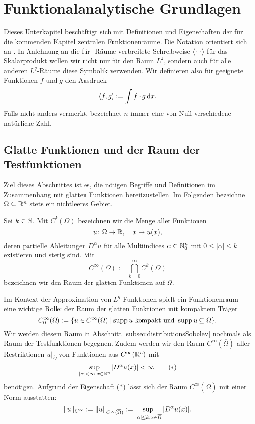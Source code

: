 \chapter{Funktionalanalytische Grundlagen}
\label{cp:grundlagen}

Dieses Unterkapitel beschäftigt sich mit Definitionen und Eigenschaften der für die kommenden Kapitel zentralen Funktionenräume.
Die Notation orientiert sich an \cite{sohr2001navier}.
In Anlehnung an die für \hilbert\hyp{}Räume verbreitete Schreibweise $\langle \cdot, \cdot \rangle$ für das Skalarprodukt wollen wir nicht nur für den Raum $L^2$, sondern auch für alle anderen $L^q$\hyp{}Räume diese Symbolik verwenden.
Wir definieren also für geeignete Funktionen $f$ und $g$ den Ausdruck
$$
\langle f, g \rangle := \int f \cdot g \, {\operatorname{d}\!{x}}.
$$
Falls nicht anders vermerkt, bezeichnet $n$ immer eine von Null verschiedene natürliche Zahl.


\section{Glatte Funktionen und der Raum der Testfunktionen}
\label{subsec:smooth}

Ziel dieses Abschnittes ist es, die nötigen Begriffe und Definitionen im Zusammenhang mit glatten Funktionen bereitzustellen.
Im Folgenden bezeichne $\Omega \subseteq \mathbb{R}^n$ stets ein nichtleeres Gebiet.

Sei $k \in \mathbb{N}$. Mit $C^k(\Omega)$ bezeichnen wir die Menge aller Funktionen
$$
u \colon \Omega \to \mathbb{R}, \quad x \mapsto u(x),
$$
deren partielle Ableitungen $D^\alpha u$ für alle Multiindices $\alpha \in \mathbb{N}_0^n$ mit $0 \leq |\alpha| \leq k$ existieren und stetig sind. 
Mit
$$
  C^\infty(\Omega) := \bigcap_{k = 0}^\infty C^k(\Omega)
$$
bezeichnen wir den Raum der glatten Funktionen auf $\Omega$.

Im Kontext der Approximation von $L^q$-Funktionen spielt ein Funktionenraum eine wichtige Rolle: der Raum der glatten Funktionen mit kompaktem Träger
$$
C_0^\infty(\Omega) := \{ u \in C^\infty(\Omega) \mid \operatorname{supp} u \text{ kompakt und } \operatorname{supp} u \subseteq \Omega\}.
$$
Wir werden diesem Raum in Abschnitt \ref{subsec:distributionsSobolev} nochmals als Raum der Testfunktionen begegnen.
Zudem werden wir den Raum $C^\infty(\overline\Omega)$ aller Restriktionen $u|_{\overline\Omega}$ von Funktionen aus $C^\infty(\mathbb{R}^n)$ mit
\begin{displaymath}
  \sup_{|\alpha| < \infty, x \in \mathbb{R}^n} |D^\alpha u(x)| < \infty \tag{$\ast$}
\end{displaymath}
benötigen.
Aufgrund der Eigenschaft ($\ast$) lässt sich der Raum $C^\infty(\overline\Omega)$ mit einer Norm ausstatten:
\begin{equation}
  \label{eq:cInftyNorm}
  \lVert u \rVert_{C^\infty} := \lVert u \rVert_{C^\infty(\overline\Omega)} := \sup_{|\alpha|\leq k, x \in \overline\Omega} |D^\alpha u(x)|.
\end{equation}

